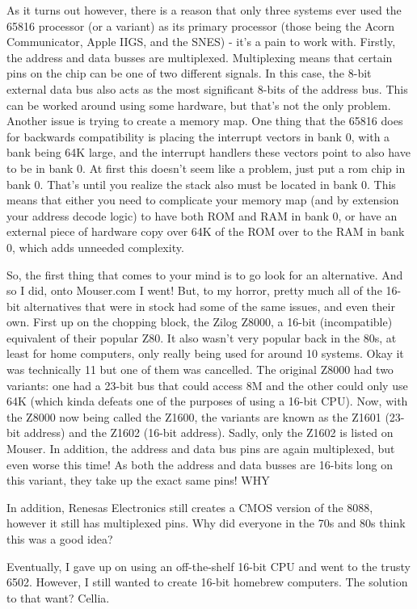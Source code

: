 \documentclass[letterpaper,12pt]{book}
\begin{document}
As it turns out however, there is a reason that only three systems ever used the 65816 processor (or a variant) as its primary processor (those being the Acorn Communicator, Apple IIGS, and the SNES) - it's a pain to work with. Firstly, the address and data busses are multiplexed. Multiplexing means that certain pins on the chip can be one of two different signals. In this case, the 8-bit external data bus also acts as the most significant 8-bits of the address bus. This can be worked around using some hardware, but that's not the only problem. Another issue is trying to create a memory map. One thing that the 65816 does for backwards compatibility is placing the interrupt vectors in bank 0, with a bank being 64K large, and the interrupt handlers these vectors point to also have to be in bank 0. At first this doesn't seem like a problem, just put a rom chip in bank 0. That's until you realize the stack also must be located in bank 0. This means that either you need to complicate your memory map (and by extension your address decode logic) to have both ROM and RAM in bank 0, or have an external piece of hardware copy over 64K of the ROM over to the RAM in bank 0, which adds unneeded complexity.

So, the first thing that comes to your mind is to go look for an alternative. And so I did, onto Mouser.com I went! But, to my horror, pretty much all of the 16-bit alternatives that were in stock had some of the same issues, and even their own. First up on the chopping block, the Zilog Z8000, a 16-bit (incompatible) equivalent of their popular Z80. It also wasn't very popular back in the 80s, at least for home computers, only really being used for around 10 systems. Okay it was technically 11 but one of them was cancelled. The original Z8000 had two variants: one had a 23-bit bus that could access 8M and the other could only use 64K (which kinda defeats one of the purposes of using a 16-bit CPU). Now, with the Z8000 now being called the Z1600, the variants are known as the Z1601 (23-bit address) and the Z1602 (16-bit address). Sadly, only the Z1602 is listed on Mouser. In addition, the address and data bus pins are again multiplexed, but even worse this time! As both the address and data busses are 16-bits long on this variant, they take up the exact same pins! WHY 

In addition, Renesas Electronics still creates a CMOS version of the 8088, however it still has multiplexed pins. Why did everyone in the 70s and 80s think this was a good idea?

Eventually, I gave up on using an off-the-shelf 16-bit CPU and went to the trusty 6502. However, I still wanted to create 16-bit homebrew computers. The solution to that want? Cellia.
\end{document}
